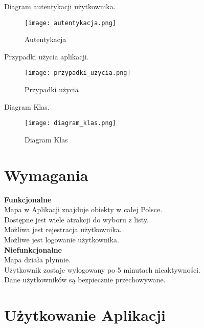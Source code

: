 \documentclass{article}
\begin{document}
Diagram autentykacji użytkownika.

\begin{figure}[H]
    \centering
    \texttt{[image: autentykacja.png]}
    \caption{Autentykacja}
    \label{fig:enter-label}
\end{figure}

Przypadki użycia aplikacji.

\begin{figure}[H]
    \centering
    \texttt{[image: przypadki\_uzycia.png]}
    \caption{Przypadki użycia}
    \label{fig:porownywanie}
\end{figure}

Diagram Klas.

\begin{figure}[H]
    \centering
        \texttt{[image: diagram\_klas.png]}
    \caption{Diagram Klas}
    \label{fig:diagram klas}
\end{figure}

\section{Wymagania}

\noindent\textbf{Funkcjonalne} \\

Mapa w Aplikacji znajduje obiekty w całej Polsce. \\

Dostępne jest wiele atrakcji do wyboru z listy. \\

Możliwa jest rejestracja użytkownika. \\

Możliwe jest logowanie użytkownika. \\

\noindent\textbf{Niefunkcjonalne} \\

Mapa działa płynnie. \\

Użytkownik zostaje wylogowany po 5 minutach nieaktywności. \\

Dane użytkowników są bezpiecznie przechowywane. \\

\section{Użytkowanie Aplikacji}
\end{document}
